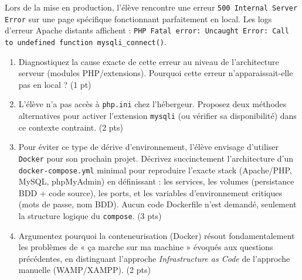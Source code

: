 \documentclass[11pt]{article}
\begin{document}
\begin{exercice}
Lors de la mise en production, l'élève rencontre une erreur \texttt{500 Internal Server Error} sur une page spécifique fonctionnant parfaitement en local. Les logs d'erreur Apache distants affichent : \texttt{PHP Fatal error: Uncaught Error: Call to undefined function mysqli\_connect()}.

\begin{enumerate}
    \item Diagnostiquez la cause exacte de cette erreur au niveau de l'architecture serveur (modules PHP/extensions). Pourquoi cette erreur n'apparaissait-elle pas en local ? (1 pt)
    \item L'élève n'a pas accès à \texttt{php.ini} chez l'hébergeur. Proposez deux méthodes alternatives pour activer l'extension \texttt{mysqli} (ou vérifier sa disponibilité) dans ce contexte contraint. (2 pts)
    \item Pour éviter ce type de dérive d'environnement, l'élève envisage d'utiliser \texttt{Docker} pour son prochain projet. Décrivez succinctement l'architecture d'un \texttt{docker-compose.yml} minimal pour reproduire l'exacte stack (Apache/PHP, MySQL, phpMyAdmin) en définissant : les services, les volumes (persistance BDD + code source), les ports, et les variables d'environnement critiques (mots de passe, nom BDD). Aucun code Dockerfile n'est demandé, seulement la structure logique du \texttt{compose}. (3 pts)
    \item Argumentez pourquoi la conteneurisation (Docker) résout fondamentalement les problèmes de « ça marche sur ma machine » évoqués aux questions précédentes, en distinguant l'approche \textit{Infrastructure as Code} de l'approche manuelle (WAMP/XAMPP). (2 pts)
\end{enumerate}
\end{exercice}
\end{document}
